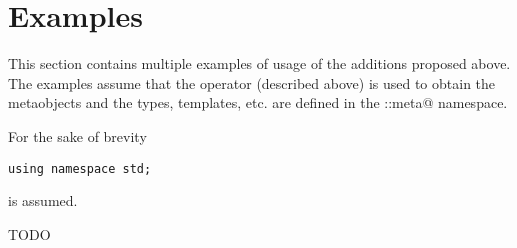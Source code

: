 \section{Examples}

This section contains multiple examples of usage of the additions proposed above.
The examples assume that the \verb@mirrored@ operator (described above) is used
to obtain the metaobjects and the types, templates, etc. are defined in the
\verb@std::meta@ namespace.

For the sake of brevity

\begin{verbatim}
using namespace std;
\end{verbatim}

is assumed.









TODO


